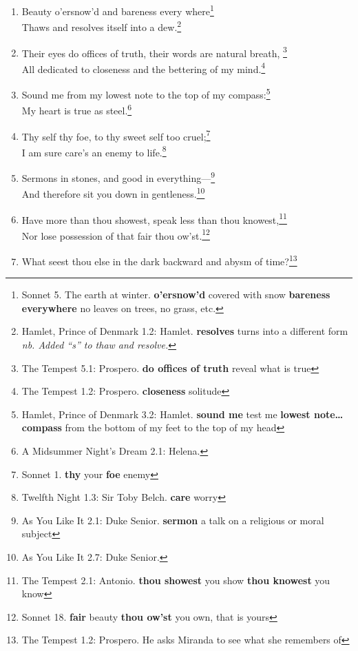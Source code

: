 \documentclass[17pt,twoside]{extarticle}
\begin{document}
\begin{enumerate}
  wheel!\footnote{King Lear 2.2: Kent. \textbf{Fortune} goddess of luck
    \textbf{smile} bring me good luck \textbf{thy} your \textbf{wheel}
    Fortune's wheel, which brings luck, misfortune, or neither.}
\item
  Beauty o'ersnow'd and bareness every where\footnote{Sonnet 5. The
    earth at winter. \textbf{o'ersnow'd} covered with snow
    \textbf{bareness everywhere} no leaves on trees, no grass, etc.}\\Thaws
  and resolves itself into a dew.\footnote{Hamlet, Prince of Denmark
    1.2: Hamlet. \textbf{resolves} turns into a different form \emph{nb.
    Added ``s'' to thaw and resolve.}}
\item
  Their eyes do offices of truth, their words are natural breath,
  \footnote{The Tempest 5.1: Prospero. \textbf{do offices of truth}
    reveal what is true}\\All dedicated to closeness and the bettering
  of my mind.\footnote{The Tempest 1.2: Prospero. \textbf{closeness}
    solitude}
\item
  Sound me from my lowest note to the top of my compass:\footnote{Hamlet,
    Prince of Denmark 3.2: Hamlet. \textbf{sound me} test me
    \textbf{lowest note\ldots{}compass} from the bottom of my feet to
    the top of my head}\\My heart is true as steel.\footnote{A Midsummer
    Night's Dream 2.1: Helena.}
\item
  Thy self thy foe, to thy sweet self too cruel;\footnote{Sonnet 1.
    \textbf{thy} your \textbf{foe} enemy}\\I am sure care's an enemy to
  life.\footnote{Twelfth Night 1.3: Sir Toby Belch. \textbf{care} worry}
\item
  Sermons in stones, and good in everything---\footnote{As You Like It
    2.1: Duke Senior. \textbf{sermon} a talk on a religious or moral
    subject}\\And therefore sit you down in gentleness.\footnote{As You
    Like It 2.7: Duke Senior.}
\item
  Have more than thou showest, speak less than thou knowest,\footnote{The
    Tempest 2.1: Antonio. \textbf{thou showest} you show \textbf{thou
    knowest} you know}\\Nor lose possession of that fair thou
  ow'st.\footnote{Sonnet 18. \textbf{fair} beauty \textbf{thou ow'st}
    you own, that is yours}
\item
  What seest thou else in the dark backward and abysm of time?\footnote{The
    Tempest 1.2: Prospero. He asks Miranda to see what she remembers of
}
\end{enumerate}
\end{document}

